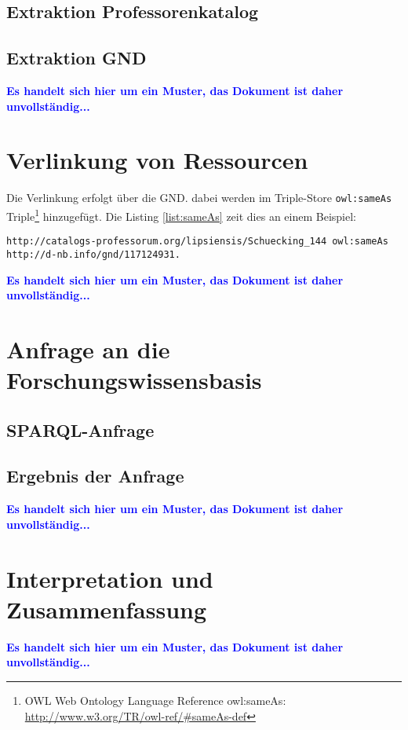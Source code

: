 \documentclass[parskip]{scrartcl}
\begin{document}
\subsection{Extraktion Professorenkatalog}

\subsection{Extraktion GND}


\textcolor{blue}{\textbf{Es handelt sich hier um ein Muster, das Dokument ist daher unvollständig...}}

\section{Verlinkung von Ressourcen}

Die Verlinkung erfolgt über die GND. dabei werden im Triple-Store \verb+owl:sameAs+ Triple\footnote{OWL Web Ontology Language
Reference owl:sameAs: \url{http://www.w3.org/TR/owl-ref/#sameAs-def}} hinzugefügt. Die Listing \ref{list:sameAs} zeit dies an einem Beispiel:

\begin{lstlisting}[caption={Beispiel für die Verwendung von owl:sameAS}, label={list:sameAs}]
http://catalogs-professorum.org/lipsiensis/Schuecking_144 owl:sameAs http://d-nb.info/gnd/117124931.
\end{lstlisting}


\textcolor{blue}{\textbf{Es handelt sich hier um ein Muster, das Dokument ist daher unvollständig...}}

\section{Anfrage an die Forschungswissensbasis}

\subsection{SPARQL-Anfrage}

\subsection{Ergebnis der Anfrage}


\textcolor{blue}{\textbf{Es handelt sich hier um ein Muster, das Dokument ist daher unvollständig...}}


\section{Interpretation und Zusammenfassung}

\textcolor{blue}{\textbf{Es handelt sich hier um ein Muster, das Dokument ist daher unvollständig...}}



\end{document}
